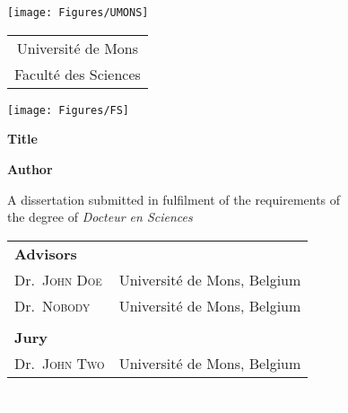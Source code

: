 \thispagestyle{empty}

\texttt{[image: Figures/UMONS]}  
\hfill
\begin{tabular}[b]{c}
{\small Université de Mons}\\
{\small Faculté des Sciences}
\end{tabular}
\hfill
\texttt{[image: Figures/FS]}

\begin{center}

\vfill

{\bf \LARGE Title} \\ %

\bigskip

{\Large \bf Author}\\

\bigskip

A dissertation submitted in fulfilment of the requirements of\\
the degree of {\em Docteur en Sciences}

\vfill

\begin{center}
\begin{small}

\begin{tabular}{l l}
{\bf Advisors}\\
Dr.\ \textsc{John Doe} &  Université de Mons, Belgium\\
Dr.\ \textsc{Nobody} &  Université de Mons, Belgium\\
\\
{\bf Jury}\\
Dr.\ \textsc{John Two} & Université de Mons, Belgium
\end{tabular}
\end{small}

\vfill

\date{\today}
\end{center}

\end{center}
\thispagestyle{empty}
\thispagestyle{empty}
\newpage
\textcolor{white}{.}

